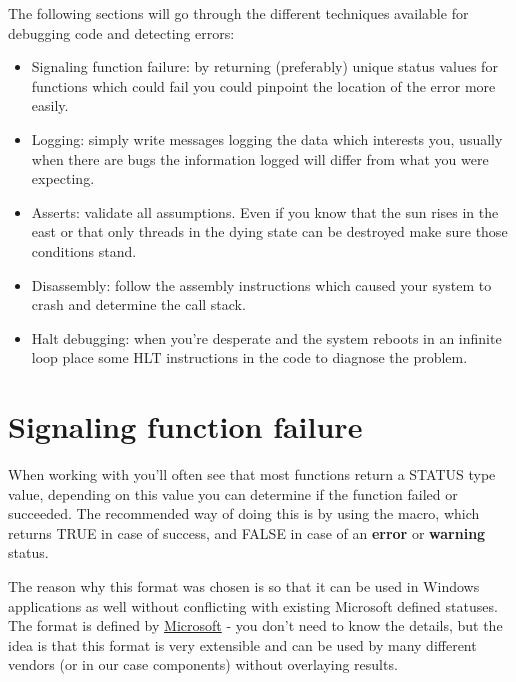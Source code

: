 \begin{appendices}
The following sections will go through the different techniques available for debugging code and
detecting errors:
\begin{itemize}
	\item Signaling function failure: by returning (preferably) unique status values for functions which could fail you could pinpoint the location of the error more easily.

	\item Logging: simply write messages logging the data which interests you, usually when there
are bugs the information logged will differ from what you were expecting.

	\item Asserts: validate all assumptions. Even if you know that the sun rises in the east or that
only threads in the dying state can be destroyed make sure those conditions stand.

	\item Disassembly: follow the assembly instructions which caused your system to crash and 
determine the call stack.

	\item Halt debugging: when you're desperate and the system reboots in an infinite loop place
some HLT instructions in the code to diagnose the problem.
\end{itemize}

\section{Signaling function failure}

When working with \projectname you'll often see that most functions return a STATUS type
value, depending on this value you can determine if the function failed or succeeded.
The recommended way of doing this is by using the  macro, which returns TRUE in
case of success, and FALSE in case of an \textbf{\color{red} error} or \textbf{\color{orange} warning} status.

The reason why this format was chosen is so that it can be used in Windows applications as well
without conflicting with existing Microsoft defined statuses. The format is defined by \href{https://docs.microsoft.com/en-us/windows-hardware/drivers/kernel/defining-new-ntstatus-values}{Microsoft} - you don't need to know the details, but the idea is that this format is very extensible and can be used by many different vendors (or in our case components) without overlaying results.


\end{appendices}
